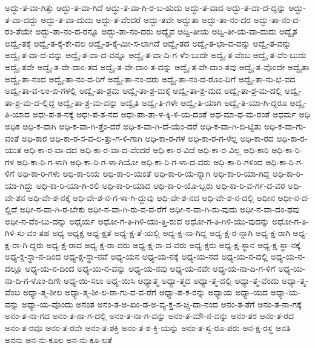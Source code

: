 {ಅದ್ಭು-ತ-ವಾ-ಗಿತ್ತು
ಅದ್ಭು-ತ-ವಾ-ಗಿದೆ
ಅದ್ಭು-ತ-ವಾ-ಗಿ-ರ-ಬ-ಹುದು
ಅದ್ಭು-ತ-ವಾದ
ಅದ್ಭು-ತ-ವಾ-ದ-ದ್ದನ್ನು
ಅದ್ಭು-ತ-ವಾ-ದದ್ದು
ಅದ್ಭು-ತ-ವಾ-ದುದು
ಅದ್ಭು-ತ-ವೆಂದರೆ
ಅದ್ಭು-ತವೇ
ಅದ್ಭುತಾ
ಅದ್ಭು-ತಾ-ನಂ-ದರ
ಅದ್ಭು-ತಾ-ನಂ-ದ-ರಂ-ತೆಯೇ
ಅದ್ಭು-ತಾ-ನಂ-ದ-ರನ್ನೂ
ಅದ್ಭು-ತಾ-ನಂ-ದರು
ಅದ್ಯೈವ
ಅದ್ವಿ-ತೀಯ
ಅದ್ವಿ-ತೀ-ಯ-ವಾ-ದುದು
ಅದ್ವೈತ
ಅದ್ವೈ-ತಕ್ಕೆ
ಅದ್ವೈ-ತ-ಕ್ಕೆ-ಕೇ-ವಲ
ಅದ್ವೈ-ತ-ಕ್ಕೆ-ಮೀ-ಸ-ಲಾಗಿದೆ
ಅದ್ವೈ-ತದ
ಅದ್ವೈ-ತ-ಭಾ-ವ-ವನ್ನು
ಅದ್ವೈ-ತ-ವನ್ನು
ಅದ್ವೈ-ತ-ವಾ-ದ-ವನ್ನು
ಅದ್ವೈ-ತ-ವಾ-ದ-ವನ್ನೂ
ಅದ್ವೈ-ತ-ವಾ-ದಿ-ಗ-ಳೆಂ-ಬುದೇ
ಅದ್ವೈ-ತ-ವೆಂಬ
ಅದ್ವೈ-ತ-ವೆಂ-ಬುದು
ಅದ್ವೈ-ತವೇ
ಅದ್ವೈ-ತ-ವೇ-ದಾಂ-ತದ
ಅದ್ವೈ-ತ-ವೇ-ದಾಂ-ತ-ವನ್ನು
ಅದ್ವೈ-ತ-ವೇ-ದಾಂ-ತವು
ಅದ್ವೈ-ತ-ವೊಂದೇ
ಅದ್ವೈತಾ
ಅದ್ವೈ-ತಾ-ನಂದ
ಅದ್ವೈ-ತಾ-ನಂ-ದ-ರಿಗೆ
ಅದ್ವೈ-ತಾ-ನಂ-ದರು
ಅದ್ವೈ-ತಾ-ನಂ-ದ-ರೊಂ-ದಿಗೆ
ಅದ್ವೈ-ತಾ-ನು-ಭ-ವದ
ಅದ್ವೈ-ತಾ-ವ-ಲಂ-ಬಿ-ಗಳಲ್ಲಿ
ಅದ್ವೈ-ತಾ-ಶ್ರಮ
ಅದ್ವೈ-ತಾ-ಶ್ರ-ಮಕ್ಕೆ
ಅದ್ವೈ-ತಾ-ಶ್ರ-ಮದ
ಅದ್ವೈ-ತಾ-ಶ್ರ-ಮ-ದಲ್ಲಿ
ಅದ್ವೈ-ತಾ-ಶ್ರ-ಮ-ದ-ಲ್ಲಿದ್ದ
ಅದ್ವೈ-ತಾ-ಶ್ರ-ಮ-ವನ್ನು
ಅದ್ವೈತಿ
ಅದ್ವೈ-ತಿ-ಗಳೇ
ಅದ್ವೈ-ತಿ-ಯಾಗಿ
ಅದ್ವೈ-ತಿ-ಯಾ-ಗಿ-ದ್ದರೂ
ಅದ್ವೈ-ತಿ-ಯಾದ
ಅಧಃ-ಪ-ತ-ನಕ್ಕೆ
ಅಧಃ-ಪ-ತ-ನದ
ಅಧಃ-ಪಾ-ತಾ-ಳ-ಕ್ಕಿ-ಳಿ-ಯ-ದಂತೆ
ಅಧ-ಮಾ-ಧ-ಮ-ರಂತೆ
ಅಧರ್ಮ
ಅಧಿ
ಅಧಿಕ
ಅಧಿ-ಕ-ವಾಗಿ
ಅಧಿ-ಕ-ವಾ-ಗಿ-ತ್ತೆಂ-ದರೆ
ಅಧಿ-ಕ-ವಾ-ಗಿ-ದೆ-ಯೆಂ-ದರೆ
ಅಧಿ-ಕ-ವಾ-ಗಿ-ಬಿ-ಟ್ಟಿತು
ಅಧಿ-ಕ-ವಾ-ಗು-ವಂತೆ
ಅಧಿ-ಕಾರ
ಅಧಿ-ಕಾ-ರ-ಸ-ವ-ಲ-ತ್ತು-ಗ-ಳಿ-ಗಾಗಿ
ಅಧಿ-ಕಾ-ರ-ಗಳ
ಅಧಿ-ಕಾ-ರ-ಗ-ಳೆಲ್ಲ
ಅಧಿ-ಕಾ-ರದ
ಅಧಿ-ಕಾ-ರ-ಯುತ
ಅಧಿ-ಕಾ-ರ-ವಾ-ದದ
ಅಧಿ-ಕಾ-ರ-ವಾ-ದ-ವೆಂದರೆ
ಅಧಿ-ಕಾ-ರ-ವಿದೆ
ಅಧಿ-ಕಾ-ರ-ವಿಲ್ಲ
ಅಧಿ-ಕಾರಿ
ಅಧಿ-ಕಾ-ರಿ-ಗಳ
ಅಧಿ-ಕಾ-ರಿ-ಗ-ಳಾಗಿ
ಅಧಿ-ಕಾ-ರಿ-ಗ-ಳಾ-ಗಿಯೋ
ಅಧಿ-ಕಾ-ರಿ-ಗ-ಳಾ-ದ-ವರು
ಅಧಿ-ಕಾ-ರಿ-ಗಳಿಂದ
ಅಧಿ-ಕಾ-ರಿ-ಗ-ಳಿಗೆ
ಅಧಿ-ಕಾ-ರಿ-ಗಳು
ಅಧಿ-ಕಾ-ರಿಯ
ಅಧಿ-ಕಾ-ರಿ-ಯಂತೆ
ಅಧಿ-ಕಾ-ರಿ-ಯ-ನ್ನಾಗಿ
ಅಧಿ-ಕಾ-ರಿ-ಯಾ-ಗಿದ್ದ
ಅಧಿ-ಕಾ-ರಿ-ಯಾ-ಗಿದ್ದು
ಅಧಿ-ಕಾ-ರಿ-ಯಾ-ಗಿ-ರಲಿ
ಅಧಿ-ಕಾ-ರಿ-ಯಾದ
ಅಧಿ-ಕಾ-ರಿ-ಯೊ-ಬ್ಬರು
ಅಧಿ-ಕಾ-ರಿ-ವ-ರ್ಗ-ದ-ವರ
ಅಧಿ-ವೇ-ಶನ
ಅಧಿ-ವೇ-ಶ-ನಕ್ಕೆ
ಅಧಿ-ವೇ-ಶ-ನ-ಗ-ಳಾ-ಗಿ-ದ್ದುವು
ಅಧಿ-ವೇ-ಶ-ನದ
ಅಧಿ-ವೇ-ಶ-ನ-ದಲ್ಲಿ
ಅಧೀನ
ಅಧೀ-ನ-ದ-ಲ್ಲಿದೆ
ಅಧೀ-ನ-ವಾ-ಗಿ-ರ-ಬೇಕು
ಅಧೀ-ನ-ವಾ-ಗಿ-ರು-ವ-ವ-ರೆಗೆ
ಅಧೀ-ನ-ವಾ-ಗಿ-ರು-ವುದು
ಅಧೀ-ನ-ವಾ-ದಂ-ಥವು
ಅಧೀ-ನ-ವೆಂ-ಬು-ದನ್ನು
ಅಧೈರ್ಯ
ಅಧೋ-ಗ-ತಿ-ಗಿಳಿ-ಯು-ತ್ತಿ-ರುವ
ಅಧೋ-ಗ-ತಿ-ಗಿಳಿ-ಯು-ವುದನ್ನು
ಅಧೋ-ಗ-ತಿ-ಗಿಳಿ-ಸು-ವಂ-ತಹ
ಅಧ್ಯ
ಅಧ್ಯಕ್ಷ
ಅಧ್ಯ-ಕ್ಷತೆ
ಅಧ್ಯ-ಕ್ಷ-ತೆ-ಯಲ್ಲಿ
ಅಧ್ಯ-ಕ್ಷ-ನಾ-ಗಿದ್ದ
ಅಧ್ಯ-ಕ್ಷ-ರ-ನ್ನಾಗಿ
ಅಧ್ಯ-ಕ್ಷ-ರಾಗಿ
ಅಧ್ಯ-ಕ್ಷ-ರಾ-ಗಿ-ದ್ದರು
ಅಧ್ಯ-ಕ್ಷ-ರಾದ
ಅಧ್ಯ-ಕ್ಷ-ರಾ-ದರು
ಅಧ್ಯ-ಕ್ಷ-ರಾ-ದ-ವರು
ಅಧ್ಯ-ಕ್ಷರು
ಅಧ್ಯ-ಕ್ಷ-ಸ್ಥಾನ
ಅಧ್ಯ-ಕ್ಷ-ಸ್ಥಾ-ನಕ್ಕೆ
ಅಧ್ಯ-ಕ್ಷ-ಸ್ಥಾ-ನ-ದಿಂದ
ಅಧ್ಯ-ಕ್ಷ-ಸ್ಥಾ-ನವೆ
ಅಧ್ಯ-ಯನ
ಅಧ್ಯ-ಯ-ನಕ್ಕೆ
ಅಧ್ಯ-ಯ-ನದ
ಅಧ್ಯ-ಯ-ನ-ದಲ್ಲಿ
ಅಧ್ಯ-ಯ-ನ-ದಲ್ಲೂ
ಅಧ್ಯ-ಯ-ನ-ದಿಂದ
ಅಧ್ಯ-ಯ-ನ-ವನ್ನು
ಅಧ್ಯ-ಯ-ನವು
ಅಧ್ಯ-ಯ-ನವೇ
ಅಧ್ಯ-ಯ-ನಾ-ದಿ-ಗ-ಳಿಗೆ
ಅಧ್ಯ-ಯ-ನಾ-ದಿ-ಗ-ಳೊಂ-ದಿಗೇ
ಅಧ್ಯ-ಯಿ-ಸಲು
ಅಧ್ಯ-ಯಿಸಿ
ಅಧ್ಯಾತ್ಮ
ಅಧ್ಯಾ-ತ್ಮದ
ಅಧ್ಯಾ-ತ್ಮ-ದಲ್ಲಿ
ಅಧ್ಯಾ-ತ್ಮ-ವೆಂದು
ಅಧ್ಯಾ-ತ್ಮ-ವೆಂಬ
ಅಧ್ಯಾ-ತ್ಮ-ಶೀಲ
ಅಧ್ಯಾ-ತ್ಮ-ಶೀ-ಲ-ರಾ-ಗು-ವ-ವ-ರೆಗೆ
ಅಧ್ಯಾ-ಪ-ಕ-ರನ್ನು
ಅಧ್ಯಾಯ
ಅಧ್ಯಾ-ಯದ
ಅಧ್ಯಾ-ಯ-ವನ್ನು
ಅಧ್ಯಾ-ಯ-ವೊಂದು
ಅನಂತ
ಅನಂ-ತ-ಅ-ಖಂ-ಡ-ಅ-ವ್ಯ-ಕ್ತ-ಸ-ಚ್ಚಿ-ದಾ-ನಂದ
ಅನಂ-ತ-ತೆಗೆ
ಅನಂ-ತ-ನಾ-ಗಕ್ಕೆ
ಅನಂ-ತ-ನಾ-ಗದ
ಅನಂ-ತ-ನಾ-ಗ-ದಲ್ಲಿ
ಅನಂ-ತ-ನಾ-ಗ-ವನ್ನು
ಅನಂ-ತ-ಮೌ-ನ-ವನ್ನು
ಅನಂ-ತರ
ಅನಂ-ತ-ರದ
ಅನಂ-ತ-ರವೂ
ಅನಂ-ತ-ರವೇ
ಅನಂ-ತ-ಶಕ್ತಿ
ಅನಂ-ತ-ಶ-ಕ್ತಿ-ಯನ್ನು
ಅನಂ-ತ-ಸ್ವ-ರೂ-ಪರು
ಅನ-ಕ್ಷ-ರಸ್ಥ
ಅನತಿ
ಅನನು
ಅನ-ನು-ಕೂಲ
ಅನ-ನು-ಕೂ-ಲತೆ
}
